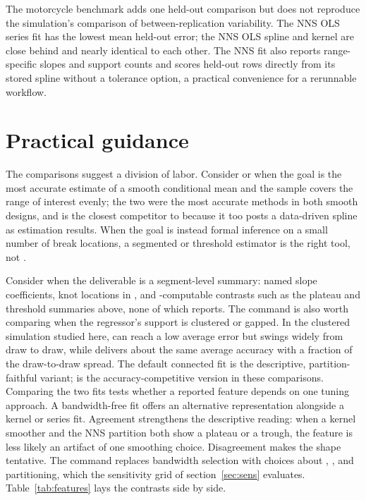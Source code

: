 \documentclass[bib]{statapress}
\begin{document}
The motorcycle benchmark adds one held-out comparison but does not reproduce
the simulation's comparison of between-replication variability.  The NNS OLS
series fit has the lowest mean held-out error; the NNS OLS spline and kernel
are close behind and nearly identical to each other.  The NNS fit also reports
range-specific slopes and support counts and scores held-out rows directly
from its stored spline without a tolerance option, a practical convenience
for a rerunnable workflow.

\section{Practical guidance}
\label{sec:practice}

The comparisons suggest a division of labor.  Consider
 or  when the goal is the most
accurate estimate of a smooth conditional mean and the sample covers the range
of interest evenly; the two were the most accurate methods in both smooth
designs, and  is the closest competitor to
 because it too posts a data-driven spline as estimation
results.  When the goal is instead formal inference on a small number of
break locations, a segmented or threshold estimator is the right tool, not
.

Consider  when the deliverable is a segment-level summary:
named slope coefficients, knot locations in , and
-computable contrasts such as the plateau and threshold summaries
above, none of which  reports.  The command is also worth
comparing when the regressor's support is clustered or gapped.  In the
clustered simulation studied here,
 can reach a low average error but swings widely from
draw to draw, while  delivers about the same average
accuracy with a fraction of the draw-to-draw spread.  The default connected
fit is the descriptive, partition-faithful variant;  is the
accuracy-competitive version in these comparisons.  Comparing the two fits
tests whether a reported feature depends on one tuning approach.  A bandwidth-free
 fit offers an alternative representation alongside a kernel or
series fit.  Agreement strengthens the descriptive reading: when a kernel smoother and the
NNS partition both show a plateau or a trough, the feature is less likely an
artifact of one smoothing choice.  Disagreement makes the shape tentative.
The command replaces bandwidth selection with choices about ,
, and partitioning, which the sensitivity grid of
section~\ref{sec:sens} evaluates.
Table~\ref{tab:features} lays the contrasts side by side.
\end{document}
